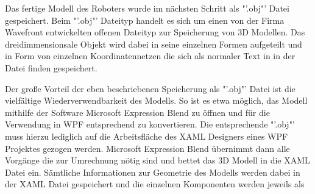 Das fertige Modell des Roboters wurde im nächsten Schritt als "'.obj"' Datei gespeichert. Beim "'.obj"' Dateityp handelt es sich um einen von der Firma Wavefront entwickelten offenen Dateityp zur Speicherung von 3D Modellen. Das dreidimmensionsale Objekt wird dabei in seine einzelnen Formen aufgeteilt und in Form von einzelnen Koordinatennetzen die sich als normaler Text in in der Datei finden gespeichert.

Der große Vorteil der eben beschriebenen Speicherung als "'.obj"' Datei ist die vielfältige Wiederverwendbarkeit des Modells. So ist es etwa möglich, das Modell mithilfe der Software Microsoft Expression Blend zu öffnen und für die Verwendung in WPF entsprechend zu konvertieren. Die entsprechende "'.obj"' muss hierzu lediglich auf die Arbeitsfläche des XAML Designers eines WPF Projektes gezogen werden. Microsoft Expression Blend übernimmt dann alle Vorgänge die zur Umrechnung nötig sind und bettet das 3D Modell in die XAML Datei ein. Sämtliche Informationen zur Geometrie des Modells werden dabei in der XAML Datei gespeichert und die einzelnen Komponenten werden jeweils als 
